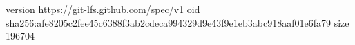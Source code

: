 version https://git-lfs.github.com/spec/v1
oid sha256:afe8205c2fee45c6388f3ab2cdeca994329d9e43f9e1eb3abc918aaf01e6fa79
size 196704
